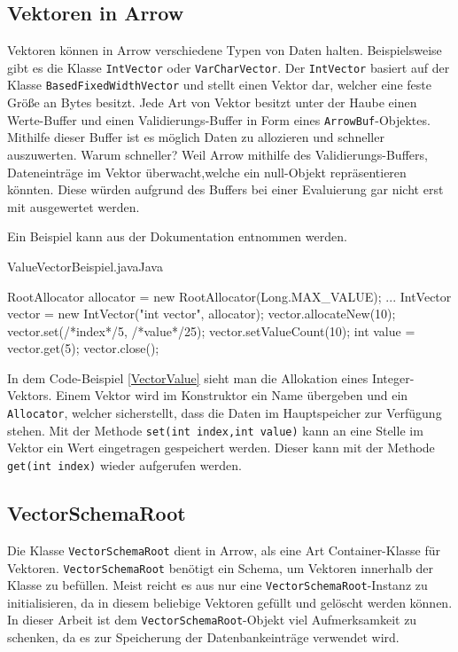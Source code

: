 \subsection{Vektoren in Arrow}
Vektoren können in Arrow verschiedene Typen von Daten halten. Beispielsweise gibt es die Klasse \texttt{IntVector} oder \texttt{VarCharVector}.
Der \texttt{IntVector} basiert auf der Klasse \texttt{BasedFixedWidthVector} und stellt einen Vektor dar, welcher eine feste Größe an Bytes besitzt. Jede Art von Vektor besitzt unter der Haube einen Werte-Buffer und einen Validierungs-Buffer in Form eines \texttt{ArrowBuf}-Objektes.\\
Mithilfe dieser Buffer ist es möglich Daten zu allozieren und schneller auszuwerten. Warum schneller?
Weil Arrow mithilfe des Validierungs-Buffers, Dateneinträge im Vektor überwacht,welche ein null-Objekt repräsentieren könnten. Diese würden aufgrund des Buffers bei einer Evaluierung gar nicht erst mit ausgewertet werden.

Ein Beispiel kann aus der Dokumentation \cite{Apache:Arrow:ValueVector} entnommen werden.

\label{VectorValue}
\begin{codeblock}{ValueVectorBeispiel.java}{Java}
  \begin{javacode}

RootAllocator allocator = new RootAllocator(Long.MAX_VALUE);
...
IntVector vector = new IntVector("int vector", allocator);
vector.allocateNew(10);
vector.set(/*index*/5, /*value*/25);
vector.setValueCount(10);
int value = vector.get(5); 
vector.close();
  \end{javacode}
\end{codeblock}

In dem Code-Beispiel \ref{VectorValue} sieht man die Allokation eines Integer-Vektors. Einem Vektor wird im Konstruktor ein Name übergeben und ein \texttt{Allocator}, welcher sicherstellt, dass die Daten im Hauptspeicher zur Verfügung stehen.
Mit der Methode \texttt{set(int index,int value)} kann an eine Stelle im Vektor ein Wert eingetragen gespeichert werden.
Dieser kann mit der Methode \texttt{get(int index)} wieder aufgerufen werden.


\subsection{VectorSchemaRoot}

Die Klasse \texttt{VectorSchemaRoot} dient in Arrow, als eine Art Container-Klasse für Vektoren. \texttt{VectorSchemaRoot} benötigt ein Schema, um Vektoren innerhalb der Klasse zu befüllen.
Meist reicht es aus nur eine \texttt{VectorSchemaRoot}-Instanz zu initialisieren, da in diesem beliebige Vektoren gefüllt und gelöscht werden können.
In dieser Arbeit ist dem \texttt{VectorSchemaRoot}-Objekt viel Aufmerksamkeit zu schenken, da es zur Speicherung der Datenbankeinträge verwendet wird.

